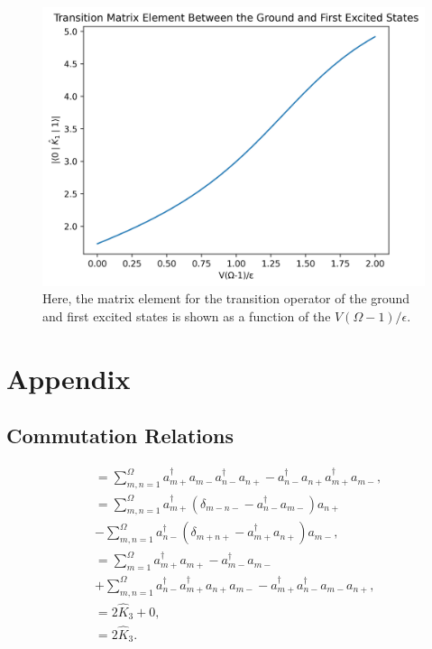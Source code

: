 \documentclass[
a4paper,
10pt,
twoside,
]{article}
\begin{document}
\begin{figure}[H]
	\centering
	\includegraphics[width=0.8\linewidth]{figures/transitionMatrixElement.png}
	\caption{
		Here, the matrix element for the transition operator of the ground and first excited states is shown as a function of the $V(\Omega-1)/\epsilon$.
	}
	\label{fig: trans_mat_elem}
\end{figure}


\section{Appendix}\label{app: I}

\subsection{Commutation Relations} \label{sapp: IA}


\begin{align}
	[\hat{K}_+,\hat{K}_-]
		&= \sum_{m,n=1}^\Omega a_{m+}^\dagger a_{m-} a_{n-}^\dagger a_{n+} - a_{n-}^\dagger a_{n+} a_{m+}^\dagger a_{m-},\\
		&= \sum_{m,n=1}^\Omega a_{m+}^\dagger (\delta_{m-n-} - a_{n-}^\dagger a_{m-}) a_{n+}\nonumber\\
		&- \sum_{m,n=1}^\Omega a_{n-}^\dagger (\delta_{m+n+} - a_{m+}^\dagger a_{n+}) a_{m-},\\
		&= \sum_{m=1}^\Omega a_{m+}^\dagger a_{m+} - a_{m-}^\dagger a_{m-}\nonumber\\
		&+ \sum_{m,n=1}^\Omega a_{n-}^\dagger a_{m+}^\dagger a_{n+} a_{m-} - a_{m+}^\dagger a_{n-}^\dagger a_{m-} a_{n+},\\
		&= 2\hat{K}_3 + 0,\\
		&= 2\hat{K}_3.
\end{align}
\end{document}
